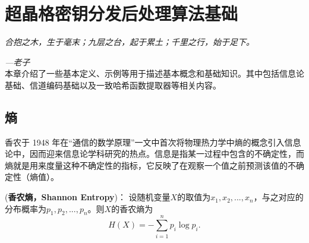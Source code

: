 
\chapter{超晶格密钥分发后处理算法基础}
\label{ch2}

\emph{\kaishu 合抱之木，生于毫末；九层之台，起于累土；千里之行，始于足下。}

\emph{\kaishu \hfill ---老子}\\


本章介绍了一些基本定义、示例等用于描述基本概念和基础知识。其中包括信息论基础、信道编码基础以及一致哈希函数提取器等相关内容。


\section{熵}


香农于 1948 年在“通信的数学原理”一文中首次将物理热力学中熵的概念引入信息论中，因而迎来信息论学科研究的热点。信息是指某一过程中包含的不确定性，而熵就是用来度量这种不确定性的指标，它反映了在观察一个值之前预测该值的不确定性（熵值）\cite{gray2011entropy}。

\begin{definition}{(\textbf{香农熵，Shannon Entropy})：}
	设随机变量$X$的取值为$x_1,x_2,...,x_n$，与之对应的分布概率为$p_1,p_2,...,p_n$。则$X$的香农熵为
	\begin{equation}
		H(X)=-\sum_{i=1}^{n}p_i\log p_i.
	\end{equation}
\end{definition}



